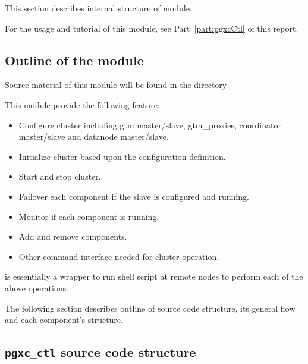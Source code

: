 %
%

  This section describes internal structure of  module.
  
  For the usage and tutorial of this module, see Part~\ref{part:pgxcCtl} of this report.



\subsection{Outline of the module}

  Source material of this module will be found in the directory 
  
  This module provide the following feature:
  
  \begin{itemize}
	  \item Configure \XC{} cluster including gtm master/slave, gtm\_proxies, coordinator
	  		master/slave and datanode master/slave.
	  \item Initialize \XC{} cluster based upon the configuration definition.
	  \item Start and stop \XC{} cluster.
	  \item Failover each component if the slave is configured and running.
	  \item Monitor if each component is running.
	  \item Add and remove components.
	  \item Other command interface needed for \XC{} cluster operation.
  \end{itemize}
  
   is essentially a  wrapper to run shell script at remote nodes
  to perform each of the above operations.
  
  The following section describes outline of  source code structure, its
  general flow and each component's structure.



\subsection{\texttt{pgxc\_ctl} source code structure}

